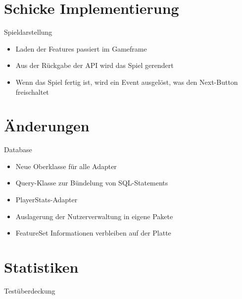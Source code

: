 \documentclass[xcolor=dvipsnames]{beamer}
\begin{document}
    \section{Schicke Implementierung}
    \begin{frame}{Spieldarstellung}
        \begin{itemize}
            \item Laden der Features passiert im Gameframe
            \item Aus der Rückgabe der API wird das Spiel gerendert
            \item Wenn das Spiel fertig ist, wird ein Event ausgelöst, was den Next-Button freischaltet
        \end{itemize}
    \end{frame}

    \section{Änderungen}
    \begin{frame}{Database}
        \begin{itemize}
            \item Neue Oberklasse für alle Adapter
            \item Query-Klasse zur Bündelung von SQL-Statements
            \item PlayerStats-Adapter
            \item Auslagerung der Nutzerverwaltung in eigene Pakete
            \item FeatureSet Informationen verbleiben auf der Platte
        \end{itemize}
    \end{frame}

    \renewcommand{\arraystretch}{1.5}

    \section{Statistiken}

    \begin{frame}{Testüberdeckung}
        \centering
    \end{frame}
\end{document}
